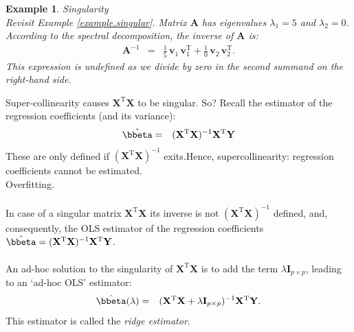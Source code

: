 \documentclass[a4paper]{article}
\theoremstyle{myexamplestyle}
\newtheorem{example}{Example}
\begin{document}
\begin{example} \textit{Singularity}
\\
Revisit Example \ref{example.singular}. Matrix $\mathbf{A}$ has eigenvalues $\lambda_1 =5$ and $\lambda_2=0$. According to the spectral decomposition, the inverse of $\mathbf{A}$ is:
\begin{eqnarray*}
\mathbf{A}^{-1} & = & \frac{1}{5} \, \mathbf{v}_1 \, \mathbf{v}_1^{\mathrm{T}} + \frac{1}{0} \, \mathbf{v}_2 \, \mathbf{v}_2^{\mathrm{T}}.
\end{eqnarray*}
This expression is undefined as we divide by zero in the second summand on the right-hand side.
\end{example}

Super-collinearity causes $\mathbf{X}^{\mathrm{T}} \mathbf{X}$ to be singular.
So? Recall the estimator of the regression coefficients (and its variance):
\begin{eqnarray}
\hat{\bbeta} & = & (\mathbf{X}^{\mathrm{T}} \mathbf{X})^{-1} \mathbf{X}^{\mathrm{T}} \mathbf{Y}
\end{eqnarray}
These are only defined if $(\mathbf{X}^{\mathrm{T}} \mathbf{X})^{-1}$ exits.Hence, supercollinearity: regression coefficients cannot be estimated.
\[
\]
Overfitting.
\\
\\
In case of a singular matrix $\mathbf{X}^{\mathrm{T}} \mathbf{X}$ its inverse is not $(\mathbf{X}^{\mathrm{T}} \mathbf{X})^{-1}$ defined, and, consequently, the OLS estimator of the regression coefficients $\hat{\bbeta} = (\mathbf{X}^{\mathrm{T}} \mathbf{X})^{-1} \mathbf{X}^{\mathrm{T}} \mathbf{Y}$.
\\
\\
An ad-hoc solution to the singularity of $\mathbf{X}^{\mathrm{T}} \mathbf{X}$ is to add the term  $\lambda \mathbf{I}_{p \times p}$, leading to an `ad-hoc OLS' estimator:
\begin{eqnarray*}
\hat{\bbeta}(\lambda) & = & (\mathbf{X}^{\mathrm{T}} \mathbf{X} + \lambda \mathbf{I}_{p \times p})^{-1} \mathbf{X}^{\mathrm{T}} \mathbf{Y}.
\end{eqnarray*}
This estimator is called the \textit{ridge estimator}.
\end{document}
